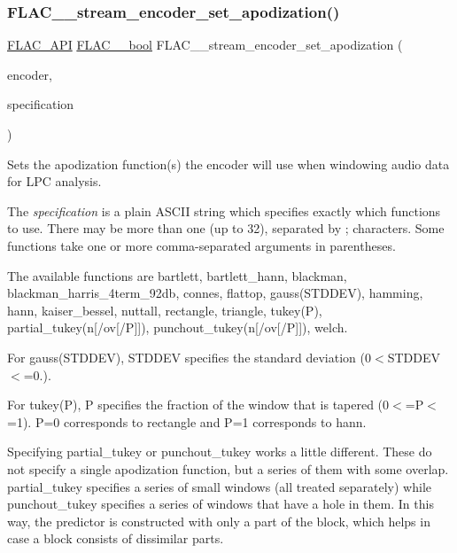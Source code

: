 \subsubsection{\texorpdfstring{F\+L\+A\+C\+\_\+\+\_\+stream\+\_\+encoder\+\_\+set\+\_\+apodization()}{FLAC\_\_stream\_encoder\_set\_apodization()}}
{\footnotesize\ttfamily \hyperlink{group__flac__export_ga56ca07df8a23310707732b1c0007d6f5}{F\+L\+A\+C\+\_\+\+A\+PI} \hyperlink{ordinals_8h_a95103469f1cbd78b8cf250194985b34e}{F\+L\+A\+C\+\_\+\+\_\+bool} F\+L\+A\+C\+\_\+\+\_\+stream\+\_\+encoder\+\_\+set\+\_\+apodization (\begin{DoxyParamCaption}\item[{\hyperlink{struct_f_l_a_c_____stream_encoder}{F\+L\+A\+C\+\_\+\+\_\+\+Stream\+Encoder} $\ast$}]{encoder,  }\item[{\hyperlink{zconf_8h_a2c212835823e3c54a8ab6d95c652660e}{const} char $\ast$}]{specification }\end{DoxyParamCaption})}

Sets the apodization function(s) the encoder will use when windowing audio data for L\+PC analysis.

The {\itshape specification} is a plain A\+S\+C\+II string which specifies exactly which functions to use. There may be more than one (up to 32), separated by {\ttfamily \textquotesingle{}};\textquotesingle{} characters. Some functions take one or more comma-\/separated arguments in parentheses.

The available functions are {\ttfamily bartlett}, {\ttfamily bartlett\+\_\+hann}, {\ttfamily blackman}, {\ttfamily blackman\+\_\+harris\+\_\+4term\+\_\+92db}, {\ttfamily connes}, {\ttfamily flattop}, {\ttfamily gauss(\+S\+T\+D\+D\+E\+V)}, {\ttfamily hamming}, {\ttfamily hann}, {\ttfamily kaiser\+\_\+bessel}, {\ttfamily nuttall}, {\ttfamily rectangle}, {\ttfamily triangle}, {\ttfamily tukey(\+P)}, {\ttfamily partial\+\_\+tukey}(n\mbox{[}/ov\mbox{[}/P\mbox{]}\mbox{]}), {\ttfamily punchout\+\_\+tukey}(n\mbox{[}/ov\mbox{[}/P\mbox{]}\mbox{]}), {\ttfamily welch}.

For {\ttfamily gauss(\+S\+T\+D\+D\+E\+V)}, S\+T\+D\+D\+EV specifies the standard deviation (0$<$S\+T\+D\+D\+EV$<$=0.).

For {\ttfamily tukey(\+P)}, P specifies the fraction of the window that is tapered (0$<$=P$<$=1). P=0 corresponds to {\ttfamily rectangle} and P=1 corresponds to {\ttfamily hann}.

Specifying {\ttfamily partial\+\_\+tukey} or {\ttfamily punchout\+\_\+tukey} works a little different. These do not specify a single apodization function, but a series of them with some overlap. partial\+\_\+tukey specifies a series of small windows (all treated separately) while punchout\+\_\+tukey specifies a series of windows that have a hole in them. In this way, the predictor is constructed with only a part of the block, which helps in case a block consists of dissimilar parts.


